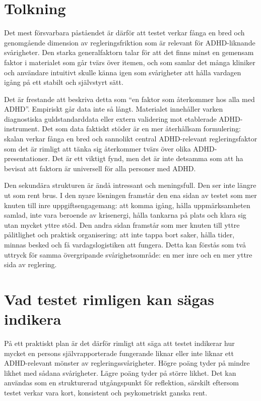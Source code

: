 \documentclass[11pt,a4paper]{article}
\begin{document}
\section{Tolkning}
Det mest försvarbara påståendet är därför att testet verkar fånga en bred och genomgående dimension av regleringsfriktion som är relevant för ADHD-liknande svårigheter. Den starka generalfaktorn talar för att det finns minst en gemensam faktor i materialet som går tvärs över itemen, och som samlar det många kliniker och användare intuitivt skulle känna igen som svårigheter att hålla vardagen igång på ett stabilt och självstyrt sätt.

Det är frestande att beskriva detta som ``en faktor som återkommer hos alla med ADHD''. Empiriskt går data inte så långt. Materialet innehåller varken diagnostiska guldstandarddata eller extern validering mot etablerade ADHD-instrument. Det som data faktiskt stöder är en mer återhållsam formulering: skalan verkar fånga en bred och sannolikt central ADHD-relevant regleringsfaktor som det är rimligt att tänka sig återkommer tvärs över olika ADHD-presentationer. Det är ett viktigt fynd, men det är inte detsamma som att ha bevisat att faktorn är universell för alla personer med ADHD.

Den sekundära strukturen är ändå intressant och meningsfull. Den ser inte längre ut som rent brus. I den nyare lösningen framstår den ena sidan av testet som mer knuten till inre uppgiftsengagemang: att komma igång, hålla uppmärksamheten samlad, inte vara beroende av krisenergi, hålla tankarna på plats och klara sig utan mycket yttre stöd. Den andra sidan framstår som mer knuten till yttre pålitlighet och praktisk organisering: att inte tappa bort saker, hålla tider, minnas besked och få vardagslogistiken att fungera. Detta kan förstås som två uttryck för samma övergripande svårighetsområde: en mer inre och en mer yttre sida av reglering.

\section{Vad testet rimligen kan sägas indikera}
På ett praktiskt plan är det därför rimligt att säga att testet indikerar hur mycket en persons självrapporterade fungerande liknar eller inte liknar ett ADHD-relevant mönster av regleringssvårigheter. Högre poäng tyder på mindre likhet med sådana svårigheter. Lägre poäng tyder på större likhet. Det kan användas som en strukturerad utgångspunkt för reflektion, särskilt eftersom testet verkar vara kort, konsistent och psykometriskt ganska rent.
\end{document}
